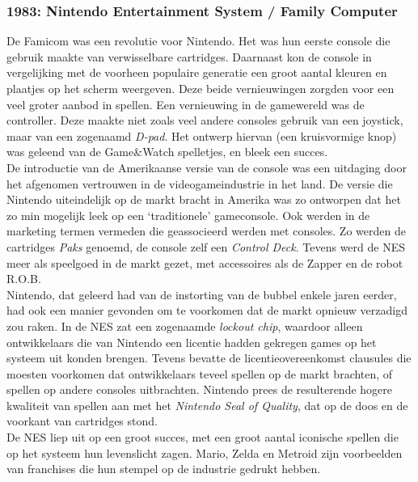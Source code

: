 \documentclass{article}
\begin{document}
\subsubsection{1983: Nintendo Entertainment System / Family Computer}
De Famicom was een revolutie voor Nintendo. Het was hun eerste console die gebruik maakte van verwisselbare cartridges. Daarnaast kon de console in vergelijking met de voorheen populaire generatie een groot aantal kleuren en plaatjes op het scherm weergeven. Deze beide vernieuwingen zorgden voor een veel groter aanbod in spellen.
Een vernieuwing in de gamewereld was de controller. Deze maakte niet zoals veel andere consoles gebruik van een joystick, maar van een zogenaamd \textit{D-pad}. Het ontwerp hiervan (een kruisvormige knop) was geleend van de Game\&Watch spelletjes, en bleek een succes. \\ 
De introductie van de Amerikaanse versie van de console was een uitdaging door het afgenomen vertrouwen in de videogameindustrie in het land. De versie die Nintendo uiteindelijk op de markt bracht in Amerika was zo ontworpen dat het zo min mogelijk leek op een `traditionele' gameconsole. Ook werden in de marketing termen vermeden die geassocieerd werden met consoles. Zo werden de cartridges \textit{Paks} genoemd, de console zelf een \textit{Control Deck}. Tevens werd de NES meer als speelgoed in de markt gezet, met accessoires als de Zapper en de robot R.O.B. \\ 
Nintendo, dat geleerd had van de instorting van de bubbel enkele jaren eerder, had ook een manier gevonden om te voorkomen dat de markt opnieuw verzadigd zou raken. In de NES zat een zogenaamde \textit{lockout chip}, waardoor alleen ontwikkelaars die van Nintendo een licentie hadden gekregen games op het systeem uit konden brengen. Tevens bevatte de licentieovereenkomst clausules die moesten voorkomen dat ontwikkelaars teveel spellen op de markt brachten, of spellen op andere consoles uitbrachten. Nintendo prees de resulterende hogere kwaliteit van spellen aan met het \textit{Nintendo Seal of Quality}, dat op de doos en de voorkant van cartridges stond.\\ 
De NES liep uit op een groot succes, met een groot aantal iconische spellen die op het systeem hun levenslicht zagen. Mario, Zelda en Metroid zijn voorbeelden van franchises die hun stempel op de industrie gedrukt hebben.
\end{document}
